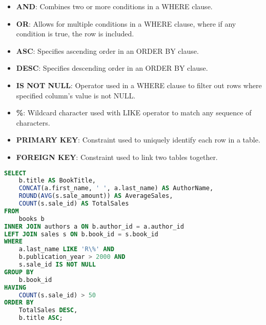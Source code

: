 \begin{itemize}[noitemsep,leftmargin=*]
    \item[]{\textbf{AND}: Combines two or more conditions in a WHERE clause.}
    \item[]{\textbf{OR}: Allows for multiple conditions in a WHERE clause, where if any condition is true, the row is included.}
    \item[]{\textbf{ASC}: Specifies ascending order in an ORDER BY clause.}
    \item[]{\textbf{DESC}: Specifies descending order in an ORDER BY clause.}
    \item[]{\textbf{IS NOT NULL}: Operator used in a WHERE clause to filter out rows where specified column's value is not NULL.}
    \item[]{\textbf{\%}: Wildcard character used with LIKE operator to match any sequence of characters.}
    \item[]{\textbf{PRIMARY KEY}: Constraint used to uniquely identify each row in a table.}
    \item[]{\textbf{FOREIGN KEY}: Constraint used to link two tables together.}
\end{itemize}

\begin{lstlisting}[language=SQL]
SELECT 
    b.title AS BookTitle, 
    CONCAT(a.first_name, ' ', a.last_name) AS AuthorName, 
    ROUND(AVG(s.sale_amount)) AS AverageSales,
    COUNT(s.sale_id) AS TotalSales
FROM 
    books b
INNER JOIN authors a ON b.author_id = a.author_id
LEFT JOIN sales s ON b.book_id = s.book_id
WHERE 
    a.last_name LIKE 'R\%' AND
    b.publication_year > 2000 AND
    s.sale_id IS NOT NULL
GROUP BY 
    b.book_id
HAVING 
    COUNT(s.sale_id) > 50
ORDER BY 
    TotalSales DESC, 
    b.title ASC;
\end{lstlisting}

